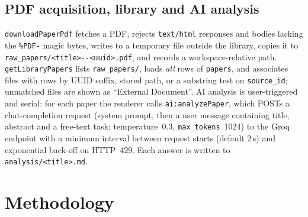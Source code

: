 \documentclass[conference]{IEEEtran}
\newcommand{\code}[1]{\texttt{\small #1}}
\begin{document}
\subsection{PDF acquisition, library and AI analysis}
\code{downloadPaperPdf} fetches a PDF, rejects \code{text/html} responses and bodies lacking the \code{\%PDF-} magic bytes, writes to a temporary file outside the library, copies it to \code{raw\_papers/<title>{-}{-}<uuid>.pdf}, and records a workspace-relative path. \code{getLibraryPapers} lists \code{raw\_papers/}, loads \emph{all} rows of \code{papers}, and associates files with rows by UUID suffix, stored path, or a substring test on \code{source\_id}; unmatched files are shown as ``External Document''. AI analysis is user-triggered and serial: for each paper the renderer calls \code{ai:analyzePaper}, which POSTs a chat-completion request (system prompt, then a user message containing title, abstract and a free-text task; temperature~0.3, \code{max\_tokens}~1024) to the Groq endpoint with a minimum interval between request starts (default 2\,s) and exponential back-off on HTTP~429. Each answer is written to \code{analysis/<title>.md}.

\section{Methodology}
\label{sec:method}
\end{document}
